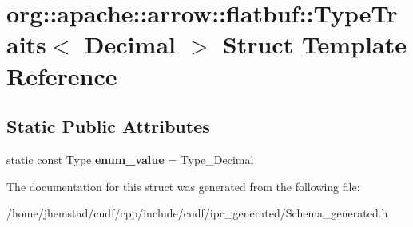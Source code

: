 \hypertarget{structorg_1_1apache_1_1arrow_1_1flatbuf_1_1TypeTraits_3_01Decimal_01_4}{}\section{org\+:\+:apache\+:\+:arrow\+:\+:flatbuf\+:\+:Type\+Traits$<$ Decimal $>$ Struct Template Reference}
\label{structorg_1_1apache_1_1arrow_1_1flatbuf_1_1TypeTraits_3_01Decimal_01_4}
\subsection*{Static Public Attributes}
\begin{DoxyCompactItemize}
\item 
static const Type {\bfseries enum\+\_\+value} = Type\+\_\+\+Decimal\hypertarget{structorg_1_1apache_1_1arrow_1_1flatbuf_1_1TypeTraits_3_01Decimal_01_4_ad33d281e21e465de30d29f1fcefeb5a4}{}\label{structorg_1_1apache_1_1arrow_1_1flatbuf_1_1TypeTraits_3_01Decimal_01_4_ad33d281e21e465de30d29f1fcefeb5a4}

\end{DoxyCompactItemize}


The documentation for this struct was generated from the following file\+:\begin{DoxyCompactItemize}
\item 
/home/jhemstad/cudf/cpp/include/cudf/ipc\+\_\+generated/Schema\+\_\+generated.\+h\end{DoxyCompactItemize}
